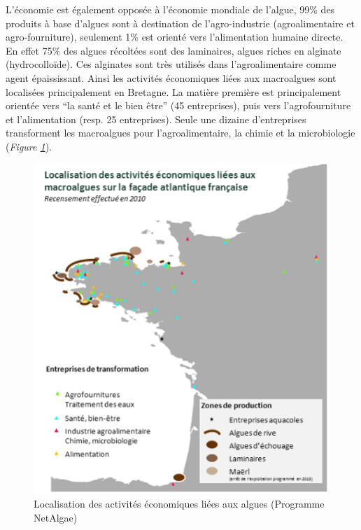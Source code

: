 \documentclass[
]{book}
\begin{document}
L'économie est également opposée à l'économie mondiale de l'algue, 99\% des produits à base d'algues sont à destination de l'agro-industrie (agroalimentaire et agro-fourniture), seulement 1\% est orienté vers l'alimentation humaine directe. En effet 75\% des algues récoltées sont des laminaires, algues riches en alginate (hydrocolloïde). Ces alginates sont très utilisés dans l'agroalimentaire comme agent épaississant.
Ainsi les activités économiques liées aux macroalgues sont localisées principalement en Bretagne. La matière première est principalement orientée vers ``la santé et le bien être'' (45 entreprises), puis vers l'agrofourniture et l'alimentation (resp. 25 entreprises). Seule une dizaine d'entreprises transforment les macroalgues pour l'agroalimentaire, la chimie et la microbiologie (\emph{Figure \ref{fig:algueatlantique}}).

\begin{figure}

{\centering \includegraphics[width=6.24in]{images/activite_algue_atlantique} 

}

\caption{Localisation des activités économiques liées aux algues (Programme NetAlgae)}\label{fig:algueatlantique}
\end{figure}
\end{document}
